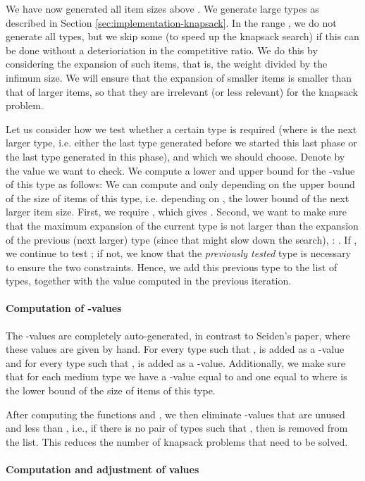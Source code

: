 We have now generated all item sizes above . 
We generate large types as described in Section \ref{sec:implementation-knapsack}.
In the range , we do not generate all  types, but we skip some (to speed up the knapsack search) if this can be done without a deterioriation in the competitive ratio. We do this by considering the expansion of such items, that is, the weight divided by the infimum size. We will ensure that the expansion of smaller items is smaller than that of larger items, so that they are irrelevant (or less relevant) for the knapsack problem.

Let us consider how we test whether a certain type  is required (where  is the next larger type, i.e. either the last type generated before we started this last phase or the last type generated in this phase), and which  we should choose. Denote by  the value we want to check. We compute a lower and upper bound  for the -value of this type as follows: We can compute  and  only depending on the upper bound of the size of items of this type, i.e. depending on , the lower bound of the next larger item size. First, we require , which gives . Second, we want to make sure that the maximum expansion of the current type is not larger than the expansion of the previous (next larger) type (since that might slow down the search), : . If , we continue to test ; if not, we know that the \textit{previously tested} type is necessary to ensure the two constraints. Hence, we add this previous type to the list of types, together with the value  computed in the previous iteration.

\paragraph{Computation of -values}
The -values are completely auto-generated, in contrast to Seiden's paper, where these values are given by hand. For every type  such that ,  is added as a -value and for every type  such that ,  is added as a -value.
Additionally, we make sure that for each medium type we have a -value equal to  and one equal to  where  is the lower bound of the size of items of this type.

After computing the functions  and , we then eliminate -values that are unused and less than , i.e., if there is no pair of types
 such that , then  is removed from the
list. This reduces the number of knapsack problems that need to be solved.

\paragraph{Computation and adjustment of values }
\label{sec:alpha-computation}

